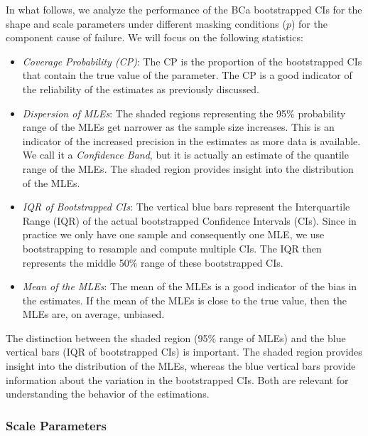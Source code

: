 \documentclass[
]{article}
\begin{document}
In what follows, we analyze the performance of the BCa bootstrapped CIs
for the shape and scale parameters under different masking conditions
(\(p\)) for the component cause of failure. We will focus on the
following statistics:

\begin{itemize}
\item
  \emph{Coverage Probability (CP)}: The CP is the proportion of the
  bootstrapped CIs that contain the true value of the parameter. The CP
  is a good indicator of the reliability of the estimates as previously
  discussed.
\item
  \emph{Dispersion of MLEs}: The shaded regions representing the 95\%
  probability range of the MLEs get narrower as the sample size
  increases. This is an indicator of the increased precision in the
  estimates as more data is available. We call it a \emph{Confidence
  Band}, but it is actually an estimate of the quantile range of the
  MLEs. The shaded region provides insight into the distribution of the
  MLEs.
\item
  \emph{IQR of Bootstrapped CIs}: The vertical blue bars represent the
  Interquartile Range (IQR) of the actual bootstrapped Confidence
  Intervals (CIs). Since in practice we only have one sample and
  consequently one MLE, we use bootstrapping to resample and compute
  multiple CIs. The IQR then represents the middle 50\% range of these
  bootstrapped CIs.
\item
  \emph{Mean of the MLEs}: The mean of the MLEs is a good indicator of
  the bias in the estimates. If the mean of the MLEs is close to the
  true value, then the MLEs are, on average, unbiased.
\end{itemize}

The distinction between the shaded region (95\% range of MLEs) and the
blue vertical bars (IQR of bootstrapped CIs) is important. The shaded
region provides insight into the distribution of the MLEs, whereas the
blue vertical bars provide information about the variation in the
bootstrapped CIs. Both are relevant for understanding the behavior of
the estimations.

\hypertarget{scale-parameters}{%
\subsubsection*{Scale Parameters}\label{scale-parameters}}
\end{document}
